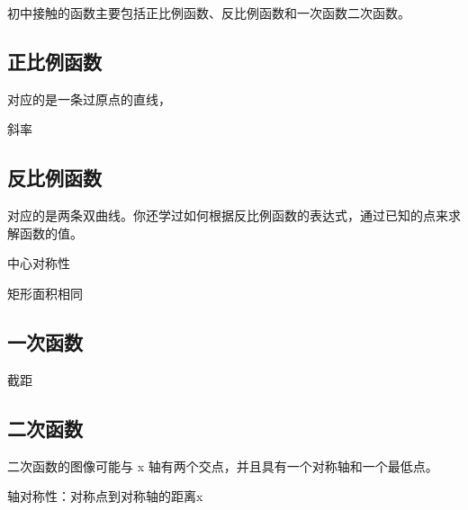 
\begin{issues}
\issueDraft
\end{issues}

初中接触的函数主要包括正比例函数、反比例函数和一次函数二次函数。

\subsection{正比例函数}

对应的是一条过原点的直线，

斜率


\subsection{反比例函数}

对应的是两条双曲线。你还学过如何根据反比例函数的表达式，通过已知的点来求解函数的值。

中心对称性

矩形面积相同


\subsection{一次函数}

截距

\subsection{二次函数}

二次函数的图像可能与  x  轴有两个交点，并且具有一个对称轴和一个最低点。

轴对称性：对称点到对称轴的距离x